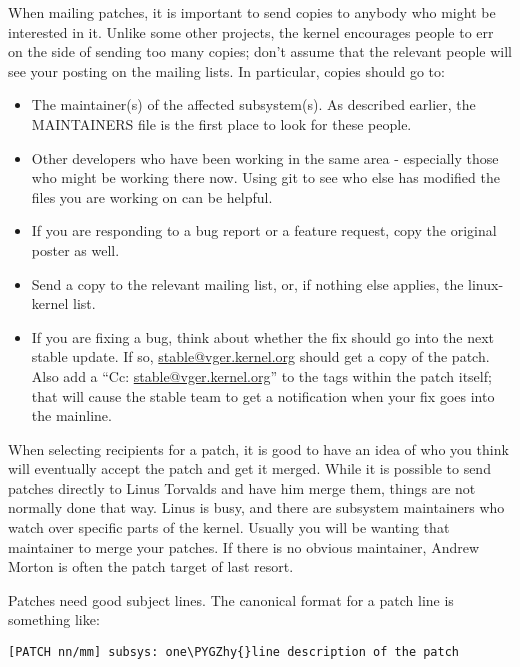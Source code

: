 \documentclass[a4paper,8pt,english]{sphinxmanual}
\def\PYGZhy{\char`\-}
\begin{document}
When mailing patches, it is important to send copies to anybody who might
be interested in it.  Unlike some other projects, the kernel encourages
people to err on the side of sending too many copies; don't assume that the
relevant people will see your posting on the mailing lists.  In particular,
copies should go to:
\begin{itemize}
\item {} 
The maintainer(s) of the affected subsystem(s).  As described earlier,
the MAINTAINERS file is the first place to look for these people.

\item {} 
Other developers who have been working in the same area - especially
those who might be working there now.  Using git to see who else has
modified the files you are working on can be helpful.

\item {} 
If you are responding to a bug report or a feature request, copy the
original poster as well.

\item {} 
Send a copy to the relevant mailing list, or, if nothing else applies,
the linux-kernel list.

\item {} 
If you are fixing a bug, think about whether the fix should go into the
next stable update.  If so, \href{mailto:stable@vger.kernel.org}{stable@vger.kernel.org} should get a copy of
the patch.  Also add a ``Cc: \href{mailto:stable@vger.kernel.org}{stable@vger.kernel.org}'' to the tags within
the patch itself; that will cause the stable team to get a notification
when your fix goes into the mainline.

\end{itemize}

When selecting recipients for a patch, it is good to have an idea of who
you think will eventually accept the patch and get it merged.  While it
is possible to send patches directly to Linus Torvalds and have him merge
them, things are not normally done that way.  Linus is busy, and there are
subsystem maintainers who watch over specific parts of the kernel.  Usually
you will be wanting that maintainer to merge your patches.  If there is no
obvious maintainer, Andrew Morton is often the patch target of last resort.

Patches need good subject lines.  The canonical format for a patch line is
something like:

\begin{Verbatim}[commandchars=\\\{\}]
[PATCH nn/mm] subsys: one\PYGZhy{}line description of the patch
\end{Verbatim}
\end{document}
